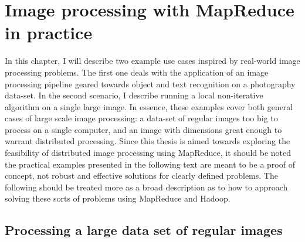 \documentclass [12pt,a4paper]{report}
\begin{document}


\chapter{Image processing with MapReduce in practice}

In this chapter, I will describe two example use cases inspired by real-world image processing problems. The first one deals with the application of an image processing pipeline geared towards object and text recognition on a photography data-set. In the second scenario, I describe running a local non-iterative algorithm on a single large image. In essence, these examples cover both general cases of large scale image processing: a data-set of regular images too big to process on a single computer, and an image with dimensions great enough to warrant distributed processing.
Since this thesis is aimed towards exploring the feasibility of distributed image processing using MapReduce, it should be noted the practical examples presented in the following text are meant to be a proof of concept, not robust and effective solutions for clearly defined problems. The following should be treated more as a broad description as to how to approach solving these sorts of problems using MapReduce and Hadoop.

\section{Processing a large data set of regular images}
\end{document}
